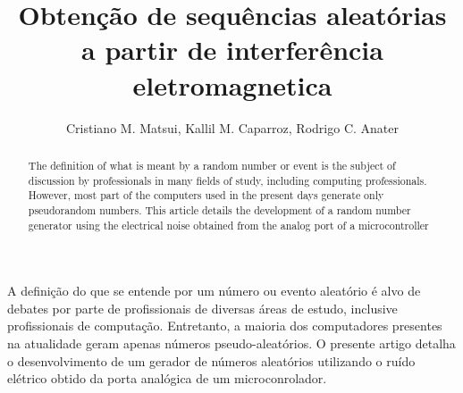 \documentclass[
12pt,				%
openright,			%
twoside,			%
a4paper,			%
sumario=tradicional, %
hidelinks,          %
num,				%
bibjustif,			%
brackets,			%
english,			%
brazil				%
]{article}       %
\title{Obtenção de sequências aleatórias a partir de interferência eletromagnetica}
\author{Cristiano M. Matsui\inst{1}, Kallil M. Caparroz\inst{2}, Rodrigo C. Anater\inst{3} }
\begin{document}
 

  \maketitle

\begin{abstract} 	
 	The definition of what is meant by a random number or event is the subject of discussion by professionals in many fields of study, including computing professionals. However, most part of the computers used in the present days generate only pseudorandom numbers. This article details the development of a random number generator using the electrical noise obtained from the analog port of a microcontroller
\end{abstract}
     
\begin{resumo} 
 	A definição do que se entende por um número ou evento aleatório é alvo de debates por parte de profissionais de diversas áreas de estudo, inclusive profissionais de computação. Entretanto, a maioria dos computadores presentes na atualidade geram apenas números pseudo-aleatórios. O presente artigo detalha o desenvolvimento de um gerador de números aleatórios utilizando o ruído elétrico obtido da porta analógica de um microconrolador.  
\end{resumo}





 





\end{document}

